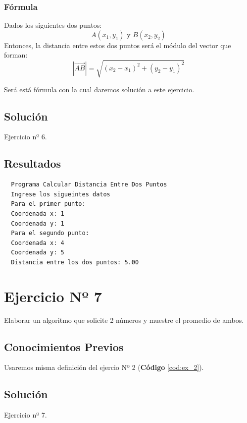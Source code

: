 \subsubsection{Fórmula}
Dados los siguientes dos puntos:
\[A(x_1, y_1)\text{ y } B(x_2, y_2)\]
Entonces, la distancia entre estos dos puntos será el módulo del vector que
forman:
\[|\overrightarrow{AB}|=\sqrt{{(x_2-x_1)}^2+{(y_2-y_1)}^2}\]

Será está fórmula con la cual daremos solución a este ejercicio.
\subsection{Solución}
\begin{longlisting}
	\caption{Ejercicio nº 6.}\label{cod:ex_6}
\end{longlisting}
\subsection{Resultados}
\begin{verbatim}
  Programa Calcular Distancia Entre Dos Puntos
  Ingrese los sigueintes datos
  Para el primer punto:
  Coordenada x: 1
  Coordenada y: 1
  Para el segundo punto:
  Coordenada x: 4
  Coordenada y: 5
  Distancia entre los dos puntos: 5.00
\end{verbatim}
\section{Ejercicio Nº 7}
Elaborar un algoritmo que solicite 2 números y muestre el promedio de ambos.
\subsection{Conocimientos Previos}
Usaremos misma definición del ejercio Nº 2 (\textbf{Código }\ref{cod:ex_2}).
\subsection{Solución}
\begin{longlisting}
	\caption{Ejercicio nº 7.}\label{cod:ex_7}
\end{longlisting}
